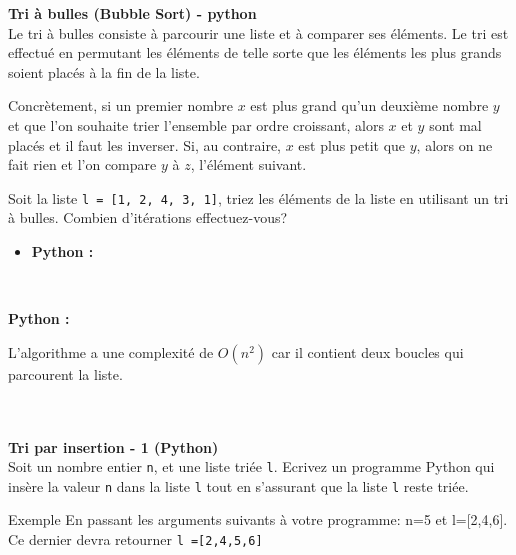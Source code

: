 \begin{Exercice} [20 minutes] \textbf{Tri à bulles (Bubble Sort) - python} \\
Le tri à bulles consiste à parcourir une liste et à comparer ses éléments. Le tri est effectué en permutant les éléments de telle sorte que les éléments les plus grands soient placés à la fin de la liste. 

Concrètement, si un premier nombre $x$ est plus grand qu'un deuxième nombre $y$ et que l'on souhaite trier l'ensemble par ordre croissant, alors $x$ et $y$ sont mal placés et il faut les inverser. Si, au contraire, $x$ est plus petit que $y$, alors on ne fait rien et l'on compare $y$ à $z$, l'élément suivant.

Soit la liste \lstinline{l = [1, 2, 4, 3, 1]}, triez les éléments de la liste en utilisant un tri à bulles. Combien d'itérations effectuez-vous?

\begin{itemize}
        \item \textbf{Python :}
             
    \end{itemize}
   
    \ \\
    
    \begin{solution}
    \textbf{Python :}
    

    L'algorithme a une complexité de $O(n^2)$ car il contient deux boucles qui parcourent la liste.\\\\\\
            
\end{solution}
\end{Exercice}


\begin{Exercice}[10 minutes] \textbf{Tri par insertion - 1 (Python)}\\
    Soit un nombre entier \lstinline{n}, et une liste triée \lstinline{l}. Ecrivez un programme Python qui insère la valeur \lstinline{n} dans la liste \lstinline{l} tout en s'assurant que la liste \lstinline{l} reste triée.

    

    \begin{Example}{\faTerminal \quad Exemple}
        En passant les arguments suivants à votre programme: n=5 et l=[2,4,6]. Ce dernier devra retourner \lstinline{l =[2,4,5,6]}
    \end{Example}

    \begin{solution}
        
    \end{solution}


\end{Exercice}

